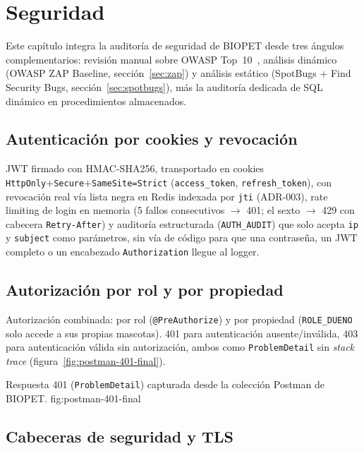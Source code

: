 \chapter{Seguridad}
\label{cap:seguridad}

Este cap\'itulo integra la auditor\'ia de seguridad de BIOPET desde tres
\'angulos complementarios: revisi\'on manual sobre OWASP Top~10~\cite{owasp-top10},
an\'alisis din\'amico (OWASP ZAP Baseline, secci\'on~\ref{sec:zap}) y
an\'alisis est\'atico (SpotBugs + Find Security Bugs,
secci\'on~\ref{sec:spotbugs}), m\'as la auditor\'ia dedicada de SQL
din\'amico en procedimientos almacenados.

\section{Autenticaci\'on por cookies y revocaci\'on}

JWT firmado con HMAC-SHA256, transportado en cookies
\texttt{HttpOnly}\allowbreak+\texttt{Secure}\allowbreak+\texttt{SameSite=Strict}
(\texttt{access\_token}, \texttt{refresh\_token}), con revocaci\'on real
v\'ia lista negra en Redis indexada por \texttt{jti} (ADR-003), rate
limiting de login en memoria (5 fallos consecutivos $\to$ 401; el sexto
$\to$ 429 con cabecera \texttt{Retry-After}) y auditor\'ia estructurada
(\texttt{AUTH\_AUDIT}) que solo acepta \texttt{ip} y \texttt{subject} como
par\'ametros, sin v\'ia de c\'odigo para que una contrase\~na, un JWT
completo o un encabezado \texttt{Authorization} llegue al logger.

\section{Autorizaci\'on por rol y por propiedad}

Autorizaci\'on combinada: por rol (\texttt{@PreAuthorize}) y por propiedad
(\texttt{ROLE\_DUENO} solo accede a sus propias mascotas). 401 para
autenticaci\'on ausente/inv\'alida, 403 para autenticaci\'on v\'alida sin
autorizaci\'on, ambos como \texttt{ProblemDetail} sin \emph{stack trace}
(figura~\ref{fig:postman-401-final}).

%
{Respuesta 401 (\texttt{ProblemDetail}) capturada desde la colecci\'on Postman de BIOPET.}%
{fig:postman-401-final}

\section{Cabeceras de seguridad y TLS}

